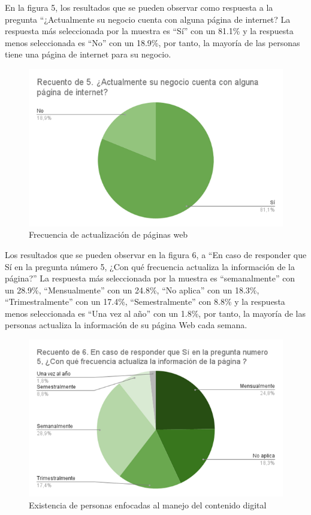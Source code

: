 \documentclass[12pt]{difu100cia} %
\begin{document}
	
En la figura 5, los resultados que se pueden observar como respuesta a la pregunta “¿Actualmente su negocio cuenta con alguna página de internet? La respuesta más seleccionada por la muestra es “Sí” con un 81.1\% y la respuesta menos seleccionada es “No” con un 18.9\%, por tanto, la mayoría de las personas tiene una página de internet para su negocio.

\begin{figure}[!htb]
	\centering
	\includegraphics[width=\linewidth]{Figura 6.png}
	\caption{Frecuencia de actualización de páginas web}
	\label{Figur 6}
\end{figure}
	
	
Los resultados que se pueden observar en la figura 6, a “En caso de responder que Sí en la pregunta número 5, ¿Con qué frecuencia actualiza la información de la página?” La respuesta más seleccionada por la muestra es “semanalmente” con un 28.9\%, “Mensualmente” con un 24.8\%, “No aplica” con un 18.3\%, “Trimestralmente” con un 17.4\%, “Semestralmente” con 8.8\%   y la respuesta menos seleccionada es “Una vez al año” con un 1.8\%, por tanto, la mayoría de las personas actualiza la información de su página Web cada semana.

\begin{figure}[!htb]
	\centering
	\includegraphics[width=\linewidth]{Figura 7.png}
	\caption{Existencia de personas enfocadas al manejo del contenido digital}
	\label{Figur 7}
\end{figure}
	
\end{document}
